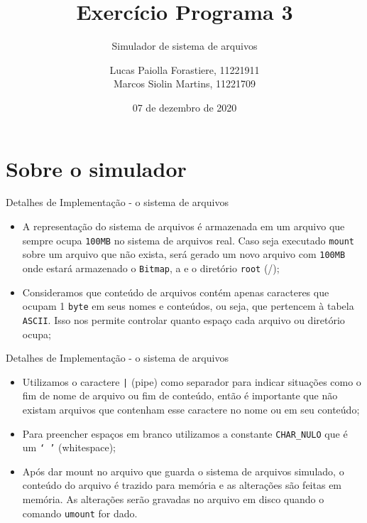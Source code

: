 \documentclass[10pt]{beamer}
\title{Exercício Programa 3}
\subtitle{Simulador de sistema de arquivos}
\institute{IME-USP}
\author{Lucas Paiolla Forastiere, 11221911\\ Marcos Siolin Martins, 11221709}
\date{07 de dezembro de 2020}
\begin{document}
    \maketitle
    \section{Sobre o simulador}
    \begin{frame}{Detalhes de Implementação - o sistema de arquivos}
        \begin{itemize}
            \justifying
            \item A representação do sistema de arquivos é armazenada em um
                arquivo que sempre ocupa \texttt{100MB} no sistema de arquivos
                real. Caso seja executado \texttt{mount} sobre um arquivo que
                não exista, será gerado um novo arquivo com \texttt{100MB} onde
                estará armazenado o \texttt{Bitmap}, a  e o diretório
                \texttt{root} (/);
            \item Consideramos que conteúdo de arquivos contém apenas caracteres
                que ocupam 1 \texttt{byte} em seus nomes e conteúdos, ou seja,
                que pertencem à tabela \texttt{ASCII}. Isso nos permite
                controlar quanto espaço cada arquivo ou diretório ocupa;
        \end{itemize}
    \end{frame}
    \begin{frame}{Detalhes de Implementação - o sistema de arquivos}
        \begin{itemize}
            \justifying
            \item Utilizamos o caractere \texttt{|} (pipe) como separador para
                indicar situações como o fim de nome de arquivo ou fim de
                conteúdo, então é importante que não existam arquivos que
                contenham esse caractere no nome ou em seu conteúdo;
            \item Para preencher espaços em branco utilizamos a constante
                \texttt{CHAR\_NULO} que é um \texttt{` '} (whitespace);
            \item Após dar mount no arquivo que guarda o sistema de arquivos
                simulado, o conteúdo do arquivo é trazido para memória e as
                alterações são feitas em memória. As alterações serão gravadas
                no arquivo em disco quando o comando \texttt{umount} for dado.
        \end{itemize}
    \end{frame}
\end{document}
